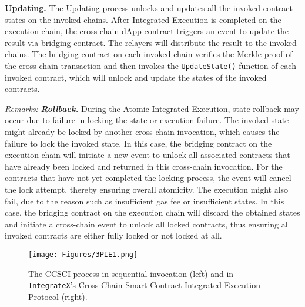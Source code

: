 \vspace{3pt}
\noindent
\textbf{Updating. }
The Updating process unlocks and updates all the invoked contract states on the invoked chains.
After Integrated Execution is completed on the execution chain, the cross-chain dApp contract triggers an event to update the result via bridging contract. 
The relayers will distribute the result to the invoked chains. 
The bridging contract on each invoked chain verifies the Merkle proof of the cross-chain transaction and 
then invokes the \texttt{UpdateState()} function of each invoked contract, which will unlock and update the states of the invoked contracts.

\vspace{3pt}
\noindent
\emph{Remarks:}
\textbf{\emph{Rollback.}}
During the Atomic Integrated Execution, state rollback may occur due to failure in locking the state or execution failure. 
The invoked state might already be locked by another cross-chain invocation, which causes the failure to lock the invoked state. 
In this case, the bridging contract on the execution chain will initiate a new event to unlock all associated contracts that have already been locked and returned in this cross-chain invocation. 
For the contracts that have not yet completed the locking process, the event will cancel the lock attempt, thereby ensuring overall atomicity.
The execution might also fail, due to the reason such as insufficient gas fee or insufficient states.
In this case, the bridging contract on the execution chain will discard the obtained states and initiate a cross-chain event to unlock all locked contracts, thus ensuring all invoked contracts are either fully locked or not locked at all.

\begin{figure}[t]
    \centering
    \texttt{[image: Figures/3PIE1.png]}
    \vspace{-18pt}
    \caption{The CCSCI process in sequential invocation (left) and in \texttt{IntegrateX}'s Cross-Chain Smart Contract Integrated
Execution Protocol (right).}
    \label{ta}
     
\end{figure} 

